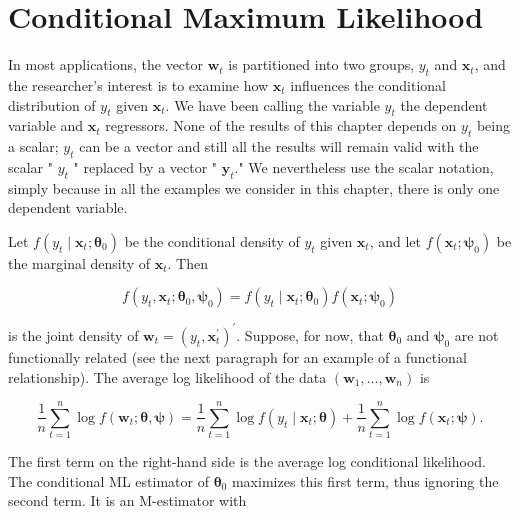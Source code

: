 \documentclass[10pt]{article}
\begin{document}
\section*{Conditional Maximum Likelihood}
In most applications, the vector $\mathbf{w}_{t}$ is partitioned into two groups, $y_{t}$ and $\mathbf{x}_{t}$, and the researcher's interest is to examine how $\mathbf{x}_{t}$ influences the conditional distribution of $y_{t}$ given $\mathbf{x}_{t}$. We have been calling the variable $y_{t}$ the dependent variable and $\mathbf{x}_{t}$ regressors. None of the results of this chapter depends on $y_{t}$ being a scalar; $y_{t}$ can be a vector and still all the results will remain valid with the scalar " $y_{t}$ " replaced by a vector " $\mathbf{y}_{t}$." We nevertheless use the scalar notation, simply because in all the examples we consider in this chapter, there is only one dependent variable.

Let $f\left(y_{t} \mid \mathbf{x}_{t} ; \boldsymbol{\theta}_{0}\right)$ be the conditional density of $y_{t}$ given $\mathbf{x}_{t}$, and let $f\left(\mathbf{x}_{t} ; \boldsymbol{\psi}_{0}\right)$ be the marginal density of $\mathbf{x}_{t}$. Then


\begin{equation*}
f\left(y_{t}, \mathbf{x}_{t} ; \boldsymbol{\theta}_{0}, \boldsymbol{\psi}_{0}\right)=f\left(y_{t} \mid \mathbf{x}_{t} ; \boldsymbol{\theta}_{0}\right) f\left(\mathbf{x}_{t} ; \boldsymbol{\psi}_{0}\right) \tag{7.1.9}
\end{equation*}


is the joint density of $\mathbf{w}_{t}=\left(y_{t}, \mathbf{x}_{t}^{\prime}\right)^{\prime}$. Suppose, for now, that $\boldsymbol{\theta}_{0}$ and $\boldsymbol{\psi}_{0}$ are not functionally related (see the next paragraph for an example of a functional relationship). The average log likelihood of the data $\left(\mathbf{w}_{1}, \ldots, \mathbf{w}_{n}\right)$ is


\begin{equation*}
\frac{1}{n} \sum_{t=1}^{n} \log f\left(\mathbf{w}_{t} ; \boldsymbol{\theta}, \boldsymbol{\psi}\right)=\frac{1}{n} \sum_{t=1}^{n} \log f\left(y_{t} \mid \mathbf{x}_{t} ; \boldsymbol{\theta}\right)+\frac{1}{n} \sum_{t=1}^{n} \log f\left(\mathbf{x}_{t} ; \boldsymbol{\psi}\right) . \tag{7.1.10}
\end{equation*}


The first term on the right-hand side is the average log conditional likelihood. The conditional ML estimator of $\boldsymbol{\theta}_{0}$ maximizes this first term, thus ignoring the second term. It is an M-estimator with
\end{document}
